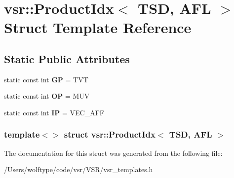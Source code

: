\hypertarget{structvsr_1_1_product_idx_3_01_t_s_d_00_01_a_f_l_01_4}{\section{vsr\-:\-:Product\-Idx$<$ T\-S\-D, A\-F\-L $>$ Struct Template Reference}
\label{structvsr_1_1_product_idx_3_01_t_s_d_00_01_a_f_l_01_4}
}
\subsection*{Static Public Attributes}
\begin{DoxyCompactItemize}
\item 
\hypertarget{structvsr_1_1_product_idx_3_01_t_s_d_00_01_a_f_l_01_4_aae671d1fb781bb13c4bf7617c1930800}{static const int {\bfseries G\-P} = T\-V\-T}\label{structvsr_1_1_product_idx_3_01_t_s_d_00_01_a_f_l_01_4_aae671d1fb781bb13c4bf7617c1930800}

\item 
\hypertarget{structvsr_1_1_product_idx_3_01_t_s_d_00_01_a_f_l_01_4_afa1f12e64362a386b7a0da52c10948f5}{static const int {\bfseries O\-P} = M\-U\-V}\label{structvsr_1_1_product_idx_3_01_t_s_d_00_01_a_f_l_01_4_afa1f12e64362a386b7a0da52c10948f5}

\item 
\hypertarget{structvsr_1_1_product_idx_3_01_t_s_d_00_01_a_f_l_01_4_a3e1ef7903c267fc0aadeaa67c8cd4754}{static const int {\bfseries I\-P} = V\-E\-C\-\_\-\-A\-F\-F}\label{structvsr_1_1_product_idx_3_01_t_s_d_00_01_a_f_l_01_4_a3e1ef7903c267fc0aadeaa67c8cd4754}

\end{DoxyCompactItemize}
\subsubsection*{template$<$$>$ struct vsr\-::\-Product\-Idx$<$ T\-S\-D, A\-F\-L $>$}



The documentation for this struct was generated from the following file\-:\begin{DoxyCompactItemize}
\item 
/\-Users/wolftype/code/vsr/\-V\-S\-R/vsr\-\_\-templates.\-h\end{DoxyCompactItemize}
